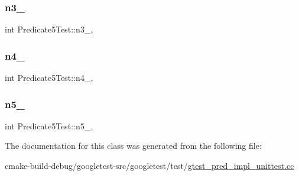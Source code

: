 \subsubsection{\texorpdfstring{n3\_}{n3\_}}
{\footnotesize\ttfamily int Predicate5\+Test\+::n3\+\_\+\hspace{0.3cm}{\ttfamily [static]}, {\ttfamily [protected]}}

\mbox{\label{classPredicate5Test_a5d66aa58badddc8d3d8070a93c0558d6}} 
\subsubsection{\texorpdfstring{n4\_}{n4\_}}
{\footnotesize\ttfamily int Predicate5\+Test\+::n4\+\_\+\hspace{0.3cm}{\ttfamily [static]}, {\ttfamily [protected]}}

\mbox{\label{classPredicate5Test_a96badba6366235a2771b27ea014bd9ce}} 
\subsubsection{\texorpdfstring{n5\_}{n5\_}}
{\footnotesize\ttfamily int Predicate5\+Test\+::n5\+\_\+\hspace{0.3cm}{\ttfamily [static]}, {\ttfamily [protected]}}



The documentation for this class was generated from the following file\+:\begin{DoxyCompactItemize}
\item 
cmake-\/build-\/debug/googletest-\/src/googletest/test/\mbox{\hyperlink{gtest__pred__impl__unittest_8cc}{gtest\+\_\+pred\+\_\+impl\+\_\+unittest.\+cc}}\end{DoxyCompactItemize}
